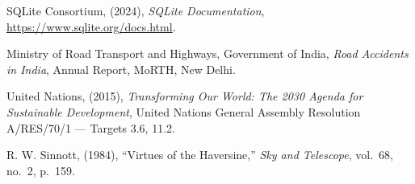 \documentclass[12pt,a4paper,oneside]{report}
\begin{document}
\begin{singlespace}
\begin{enumerate}[label={[\arabic*]},leftmargin=*,itemsep=0.85em,topsep=0.5em]
\item SQLite Consortium, (2024), \textit{SQLite Documentation},
\url{https://www.sqlite.org/docs.html}.

\item Ministry of Road Transport and Highways, Government of India, \textit{Road Accidents
in India}, Annual Report, MoRTH, New Delhi.

\item United Nations, (2015), \textit{Transforming Our World: The 2030 Agenda for
Sustainable Development}, United Nations General Assembly Resolution A/RES/70/1 ---
Targets 3.6, 11.2.

\item R. W. Sinnott, (1984), ``Virtues of the Haversine,'' \textit{Sky and Telescope},
vol.~68, no.~2, p.~159.

\end{enumerate}
\end{singlespace}
\end{document}
